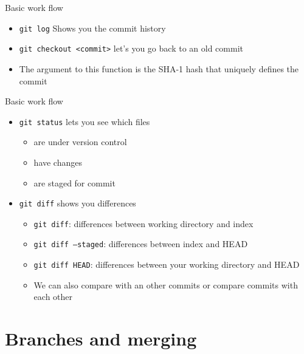 \documentclass[12pt]{beamer}
\begin{document}
\begin{frame}[fragile]{Basic work flow}
	\begin{itemize}
		\item \texttt{git log} Shows you the commit history 
		\item \texttt{git checkout <commit>} let's you go back to an old commit
		\item The argument to this function is the SHA-1 hash that uniquely defines the commit
	\end{itemize}
\end{frame}


\begin{frame}[fragile]{Basic work flow}
\begin{itemize}
\item \texttt{git status} lets you see which files
\begin{itemize}
\item are under version control
\item have changes
\item are staged for commit
\end{itemize}
\item \texttt{git diff} shows you differences
\begin{itemize}
\item \texttt{git diff}: differences between working directory and index
\item \texttt{git diff --staged}: differences between index and HEAD 
\item \texttt{git diff HEAD}:  differences between your working directory and HEAD
\item We can also compare with an other commits or compare commits with each other
\end{itemize}

\end{itemize}
\end{frame}


 \section{Branches and merging}
\end{document}
